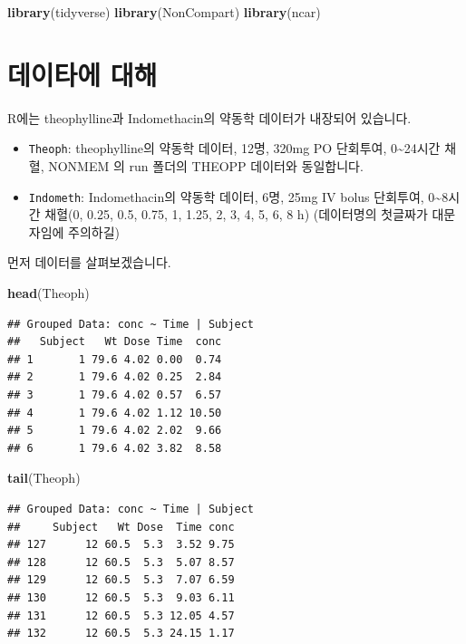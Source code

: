\documentclass[12pt,]{krantz}
\newenvironment{Shaded}{\begin{snugshade}}{\end{snugshade}}
\newcommand{\KeywordTok}[1]{\textcolor[rgb]{0.13,0.29,0.53}{\textbf{#1}}}
\newcommand{\NormalTok}[1]{#1}
\providecommand{\tightlist}{%
  \setlength{\itemsep}{0pt}\setlength{\parskip}{0pt}}
\theoremstyle{definition}
\theoremstyle{definition}
\theoremstyle{definition}
\theoremstyle{remark}
\begin{document}
\begin{Shaded}
\begin{Highlighting}[]
\KeywordTok{library}\NormalTok{(tidyverse)}
\KeywordTok{library}\NormalTok{(NonCompart)}
\KeywordTok{library}\NormalTok{(ncar)}
\end{Highlighting}
\end{Shaded}

\section{데이타에 대해}\label{TheophData}

R에는 theophylline과 Indomethacin의 약동학 데이터가 내장되어 있습니다.

\begin{itemize}
\tightlist
\item
  \texttt{Theoph}: theophylline의 약동학 데이터, 12명, 320mg PO
  단회투여, 0\textasciitilde{}24시간 채혈, NONMEM 의 run 폴더의 THEOPP
  데이터와 동일합니다.
\item
  \texttt{Indometh}: Indomethacin의 약동학 데이터, 6명, 25mg IV bolus
  단회투여, 0\textasciitilde{}8시간 채혈(0, 0.25, 0.5, 0.75, 1, 1.25, 2,
  3, 4, 5, 6, 8 h) (데이터명의 첫글짜가 대문자임에 주의하길)
\end{itemize}

먼저 데이터를 살펴보겠습니다.

\begin{Shaded}
\begin{Highlighting}[]
\KeywordTok{head}\NormalTok{(Theoph)}
\end{Highlighting}
\end{Shaded}

\begin{verbatim}
## Grouped Data: conc ~ Time | Subject
##   Subject   Wt Dose Time  conc
## 1       1 79.6 4.02 0.00  0.74
## 2       1 79.6 4.02 0.25  2.84
## 3       1 79.6 4.02 0.57  6.57
## 4       1 79.6 4.02 1.12 10.50
## 5       1 79.6 4.02 2.02  9.66
## 6       1 79.6 4.02 3.82  8.58
\end{verbatim}

\begin{Shaded}
\begin{Highlighting}[]
\KeywordTok{tail}\NormalTok{(Theoph)}
\end{Highlighting}
\end{Shaded}

\begin{verbatim}
## Grouped Data: conc ~ Time | Subject
##     Subject   Wt Dose  Time conc
## 127      12 60.5  5.3  3.52 9.75
## 128      12 60.5  5.3  5.07 8.57
## 129      12 60.5  5.3  7.07 6.59
## 130      12 60.5  5.3  9.03 6.11
## 131      12 60.5  5.3 12.05 4.57
## 132      12 60.5  5.3 24.15 1.17
\end{verbatim}
\end{document}
